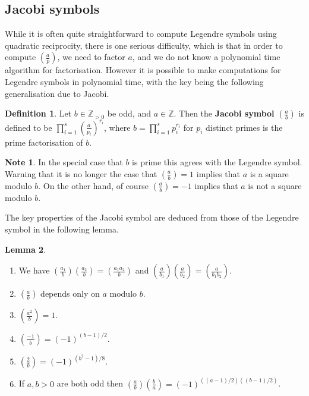 \documentclass{article}
\newcommand{\Z}{\mathbb{Z}}
\newcommand{\rb}[1]{\left( #1 \right)}
\newcommand{\legendre}[2]{\rb{\tfrac{#1}{#2}}}
\theoremstyle{definition}\newtheorem{definition}{Definition}
\theoremstyle{definition}\newtheorem{remark}[definition]{Remark}
\theoremstyle{definition}\newtheorem*{example}{Example}
\theoremstyle{definition}\newtheorem*{note}{Note}
\newtheorem{lemma}[definition]{Lemma}
\begin{document}
\subsection{Jacobi symbols}

While it is often quite straightforward to compute Legendre symbols using quadratic reciprocity, there is one serious difficulty, which is that in order to compute $ \legendre{a}{p} $, we need to factor $ a $, and we do not know a polynomial time algorithm for factorisation. However it is possible to make computations for Legendre symbols in polynomial time, with the key being the following generalisation due to Jacobi.

\begin{definition}
Let $ b \in \Z_{> 0} $ be odd, and $ a \in \Z $. Then the \textbf{Jacobi symbol} $ \legendre{a}{b} $ is defined to be $ \prod_{i = 1}^s \legendre{a}{p_i}^{r_i} $, where $ b = \prod_{i = 1}^s p_i^{r_i} $ for $ p_i $ distinct primes is the prime factorisation of $ b $.
\end{definition}

\begin{note}
In the special case that $ b $ is prime this agrees with the Legendre symbol. Warning that it is no longer the case that $ \legendre{a}{b} = 1 $ implies that $ a $ is a square modulo $ b $. On the other hand, of course $ \legendre{a}{b} = -1 $ implies that $ a $ is not a square modulo $ b $.
\end{note}


The key properties of the Jacobi symbol are deduced from those of the Legendre symbol in the following lemma.

\begin{lemma}
\hfill
\begin{enumerate}
\item We have $ \legendre{a_1}{b}\legendre{a_2}{b} = \legendre{a_1a_2}{b} $ and $ \legendre{a}{b_1}\legendre{a}{b_2} = \legendre{a}{b_1b_2} $.
\item $ \legendre{a}{b} $ depends only on $ a $ modulo $ b $.
\item $ \legendre{a^2}{b} = 1 $.
\item $ \legendre{-1}{b} = \rb{-1}^{\rb{b - 1} / 2} $.
\item $ \legendre{2}{b} = \rb{-1}^{\rb{b^2 - 1} / 8} $.
\item If $ a, b > 0 $ are both odd then $ \legendre{a}{b}\legendre{b}{a} = \rb{-1}^{\rb{\rb{a - 1} / 2}\rb{\rb{b - 1} / 2}} $.
\end{enumerate}
\end{lemma}
\end{document}
